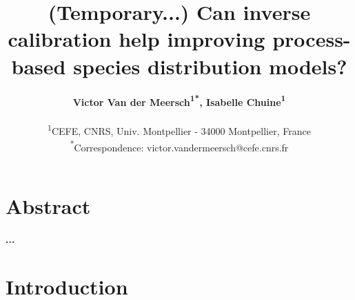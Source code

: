 \documentclass[letterpaper,8pt]{extarticle}  %
\title{(Temporary...) Can inverse calibration help improving process-based species distribution models?}
\author{%
\textbf{Victor Van der Meersch\textcolor{Accent}{\textsuperscript{1*}}, %
Isabelle Chuine\textcolor{Accent}{\textsuperscript{1}} %
}\\
\begin{small}\textcolor{Accent}{\textsuperscript{1}}CEFE, CNRS, Univ. Montpellier - 34000 Montpellier, France \\ 
\textcolor{Accent}{\textsuperscript{*}}Correspondence: \textcolor{Accent}{victor.vandermeersch@cefe.cnrs.fr} \\ \end{small}
}
\date{}
\begin{document}
\maketitle

\section*{Abstract}

\begin{doublespacing}
\begin{linenumbers}

\noindent
\textbf{...}

\section{Introduction}





\end{linenumbers}
\end{doublespacing}
\end{document}
